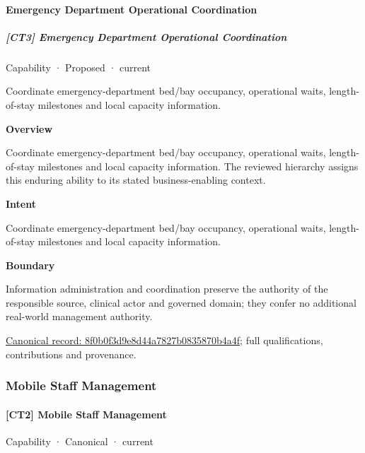 \paragraph{Emergency Department Operational Coordination}

\subparagraph{[CT3] Emergency Department Operational Coordination}

\label{element:8f0b0f3d9e8d44a7827b0835870b4a4f}
{\small Capability · Proposed · current}\par

Coordinate emergency-department bed/bay occupancy, operational waits, length-of-stay milestones and local capacity information.



\textbf{Overview}



Coordinate emergency-department bed/bay occupancy, operational waits, length-of-stay milestones and local capacity information. The reviewed hierarchy assigns this enduring ability to its stated business-enabling context.



\textbf{Intent}



Coordinate emergency-department bed/bay occupancy, operational waits, length-of-stay milestones and local capacity information.



\textbf{Boundary}



Information administration and coordination preserve the authority of the responsible source, clinical actor and governed domain; they confer no additional real-world management authority.


{\footnotesize \href{../../../../continuum/strategy/capability/8f0b0f3d9e8d44a7827b0835870b4a4f.md}{Canonical record: 8f0b0f3d9e8d44a7827b0835870b4a4f}; full qualifications, contributions and provenance.}\par
\subsubsection{Mobile Staff Management}

\paragraph{[CT2] Mobile Staff Management}

\label{element:79a4a48fddf74c69acf7e16404d06ea5}
{\small Capability · Canonical · current}\par

